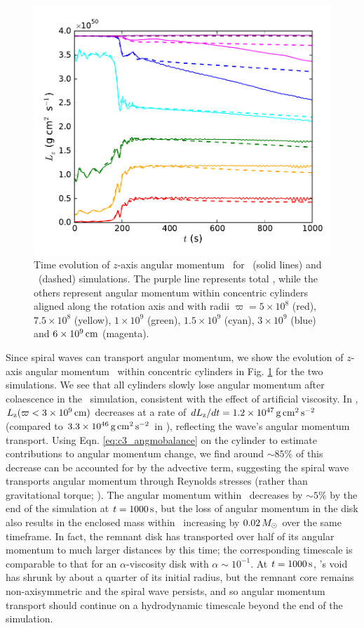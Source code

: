 \begin{figure}
\centering
\includegraphics[angle=0,width=0.6\columnwidth]{chapter3_zhu+u/figures/Lz.pdf}
\caption{Time evolution of $z$-axis angular momentum \Lz\ for \arepo\ (solid lines) and \gasoline\ (dashed) simulations.  The purple line represents total \Lz, while the others represent angular momentum within concentric cylinders aligned along the rotation axis and with radii $\varpi = 5\times10^8$ (red), $7.5\times10^8$ (yellow), $1\times10^9$ (green), $1.5\times10^9$ (cyan), $3\times10^9$ (blue) and $6\times10^9\,\mathrm{cm}$ (magenta).}
\label{fig:c3_angmo}
\end{figure}

Since spiral waves can transport angular momentum, we show the evolution of $z$-axis angular momentum \Lz\ within concentric cylinders in Fig. \ref{fig:c3_angmo} for the two simulations.  We see that all cylinders slowly lose angular momentum after colaescence in the \gasoline\ simulation, consistent with the effect of artificial viscosity.  In \arepo, $\Lz(\varpi < 3\times10^9\,\mrm{cm})$ decreases at a rate of $d\Lz/dt = 1.2\times10^{47}\,\mrm{g}\,\mrm{cm}^2\,\mrm{s}^{-2}$ (compared to $3.3\times10^{46}\,\mathrm{g}\,\mathrm{cm}^2\,\mathrm{s}^{-2}$ in \gasoline), reflecting the wave's angular momentum transport.  Using Eqn. \ref{eq:c3_angmobalance} on the cylinder to estimate contributions to angular momentum change, we find around $\sim85$\% of this decrease can be accounted for by the advective term, suggesting the spiral wave transports angular momentum through Reynolds stresses (rather than gravitational torque; \citealt{kratl16}).  The angular momentum within \innercyl\ decreases by $\sim5$\% by the end of the simulation at $t = 1000\,\mathrm{s}$, but the loss of angular momentum in the disk also results in the enclosed mass within \innercyl\ increasing by $0.02\,\Msun$ over the same timeframe.  In fact, the remnant disk has transported over half of its angular momentum to much larger distances by this time; the corresponding timescale is comparable to that for an $\alpha$-viscosity disk with $\alpha \sim 10^{-1}$.  At $t = 1000\,\mathrm{s}$, \arepo's void has shrunk by about a quarter of its initial radius, but the remnant core remains non-axisymmetric and the spiral wave persists, and so angular momentum transport should continue on a hydrodynamic timescale beyond the end of the simulation.

